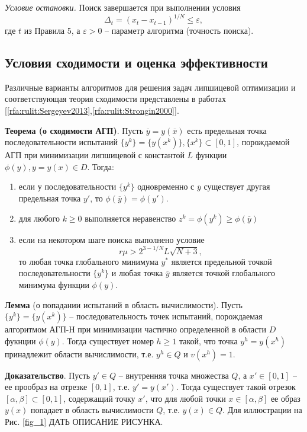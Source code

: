 \documentclass[10pt,a4paper]{book}
\begin{document}
\textit{Условие остановки.} Поиск завершается при выполнении условия 
\[
\Delta _t = (x_t-x_{t-1})^{1/N} \leq \varepsilon,
\]
где $t$ из Правила 5, а $\varepsilon>0$ -- параметр алгоритма (точность поиска).

\subsection{Условия сходимости и оценка эффективности}

Различные варианты алгоритмов для решения задач липшицевой оптимизации и соответствующая теория сходимости представлены в работах [\ref{rfa:rulit:Sergeyev2013},\ref{rfa:rulit:Strongin2000}]. 

\textbf{Теорема (о сходимости АГП)}. Пусть $\overline{y}=y(\overline{x})$ есть предельная точка последовательности испытаний $\{y^k\}=\{y(x^k)\}, \{x^k\} \subset [0,1]$, порождаемой АГП при минимизации липшицевой с константой $L$ функции $\phi(y), y = y(x) \in D$. Тогда: 

\begin{enumerate}
\item
если у последовательности $\{y^k\}$ одновременно с $\overline{y}$ существует другая предельная точка $y'$, то  $\phi(\overline{y}) = \phi(y')$.
\item
для любого $k \geq 0$ выполняется неравенство $z^k = \phi(y^k) \geq \phi(\overline{y})$
\item
если на некотором шаге поиска выполнено условие 
\[
r\mu > 2^{3-1/N}L\sqrt{N+3},
\]
то любая точка глобального минимума $y^*$ является предельной точкой последовательности $\{y^k\}$ и любая точка $\overline{y}$ является точкой глобального минимума функции $\phi(y)$.
\end{enumerate}

\textbf{Лемма} (о попадании испытаний в область вычислимости). Пусть $\{y^k\}=\{y(x^k)\}$ -- последовательность точек испытаний, порождаемая алгоритмом АГП-Н при минимизации частично определенной в области $D$ фукнции $\phi(y)$. Тогда существует номер $h \geq 1$ такой, что точка $y^h = y(x^h)$ принадлежит области вычислимости, т.е. $y^h \in Q$ и $v(x^h) = 1$.

\textbf{Доказательство}. Пусть $y' \in Q$ -- внутренняя точка множества $Q$, а $x' \in [0,1]$ -- ее прообраз на отрезке $[0,1]$, т.е. $y' = y(x')$. Тогда существует такой отрезок $[\alpha, \beta] \subset [0, 1]$, содержащий точку $x'$, что для любой точки $x \in [\alpha, \beta]$ ее образ $y(x)$ попадает в область вычислимости $Q$, т.е. $y(x) \in Q$. Для иллюстрации на Рис. \ref{fig_1} \colorbox[rgb]{1,1,0}{ДАТЬ ОПИСАНИЕ РИСУНКА}. 
\end{document}
